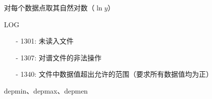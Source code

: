 \label{cmd:log}

对每个数据点取其自然对数（$\ln y$）

\begin{SACSTX}
LOG
\end{SACSTX}

\begin{itemize}
\item[-]1301: 未读入文件
\item[-]1307: 对谱文件的非法操作
\item[-]1340: 文件中数据值超出允许的范围（要求所有数据值均为正）
\end{itemize}

depmin、depmax、depmen

